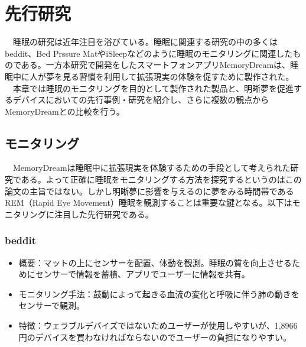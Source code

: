 \chapter{先行研究}
\label{chap:search}

　睡眠の研究は近年注目を浴びている。睡眠に関連する研究の中の多くはbeddit\cite{beddit}、Bed Prssure MatやiSleep\cite{iSleep}などのように睡眠のモニタリングに関連したものである。一方本研究で開発をしたスマートフォンアプリMemoryDreamは、睡眠中に人が夢を見る習慣を利用して拡張現実の体験を促すために製作された。\\
　本章では睡眠のモニタリングを目的として製作された製品と、明晰夢を促進するデバイスにおいての先行事例・研究を紹介し、さらに複数の観点からMemoryDreamとの比較を行う。

\section{モニタリング}
　MemoryDreamは睡眠中に拡張現実を体験するための手段として考えられた研究である。よって正確に睡眠をモニタリングする方法を探究するというのはこの論文の主旨ではない。しかし明晰夢に影響を与えるのに夢をみる時間帯であるREM（Rapid Eye Movement）睡眠を観測することは重要な鍵となる。以下はモニタリングに注目した先行研究である。

\subsection{beddit}
\begin{itemize}
\item 概要：マットの上にセンサーを配置、体動を観測。睡眠の質を向上させるためにセンサーで情報を蓄積、アプリでユーザーに情報を共有。
\item モニタリング手法：鼓動によって起きる血流の変化と呼吸に伴う肺の動きをセンサーで観測。\cite{beddit}
\item 特徴：ウェラブルデバイズではないためユーザーが使用しやすいが、1,8966円のデバイスを買わなければならないのでユーザーの負担になりやすい。
\end{itemize}

